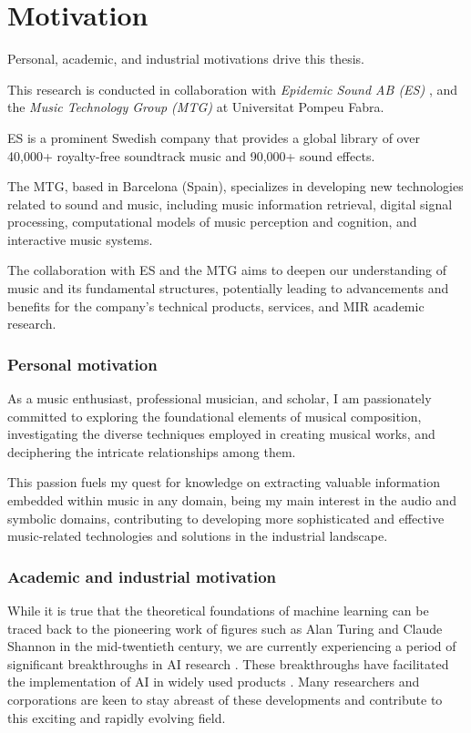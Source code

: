 \section{Motivation}

Personal, academic, and industrial motivations drive this thesis. 

This research is conducted in collaboration with \textit{Epidemic Sound AB (ES)} \cite{EpidemicSite}, and the \textit{Music Technology Group (MTG)} at Universitat Pompeu Fabra.

ES is a prominent Swedish company that provides a global library of over 40,000+ royalty-free soundtrack music and 90,000+ sound effects.

The MTG, based in Barcelona (Spain), specializes in developing new technologies related to sound and music, including music information retrieval, digital signal processing, computational models of music perception and cognition, and interactive music systems. 

The collaboration with ES and the MTG aims to deepen our understanding of music and its fundamental structures, potentially leading to advancements and benefits for the company's technical products, services, and MIR academic research.

\subsubsection{Personal motivation}

As a music enthusiast, professional musician, and scholar, I am passionately committed to exploring the foundational elements of musical composition, investigating the diverse techniques employed in creating musical works, and deciphering the intricate relationships among them. 

This passion fuels my quest for knowledge on extracting valuable information embedded within music in any domain, being my main interest in the audio and symbolic domains, contributing to developing more sophisticated and effective music-related technologies and solutions in the industrial landscape.

\subsubsection{Academic and industrial motivation}

While it is true that the theoretical foundations of machine learning can be traced back to the pioneering work of figures such as Alan Turing and Claude Shannon in the mid-twentieth century, we are currently experiencing a period of significant breakthroughs in AI research \cite{Vaswani2017AttentionNeed}. These breakthroughs have facilitated the implementation of AI in widely used products \cite{OpenAI2023GPT-4Report}. Many researchers and corporations are keen to stay abreast of these developments and contribute to this exciting and rapidly evolving field.

